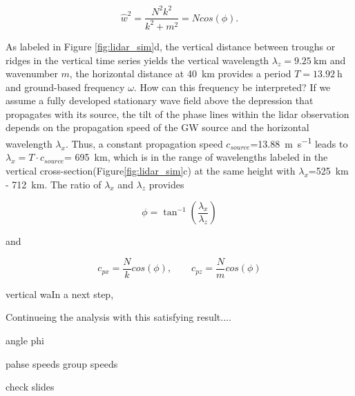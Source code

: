 \begin{equation}
    \hat{w}^2 = \frac{N^2k^2}{k^2+m^2} = Ncos(\phi).
    \label{equ_lid:dispersion}
\end{equation}

As labeled in Figure \ref{fig:lidar_sim}d, the vertical distance between troughs or ridges in the vertical time series yields the vertical wavelength $\lambda_z=\SI{9.25}{\kilo \meter}$ and wavenumber $m$, the horizontal distance at \SI{40}{\kilo \meter} provides a period $T=\SI{13.92}{\hour}$ and ground-based frequency $\omega$. How can this frequency be interpreted? If we assume a fully developed stationary wave field above the depression that propagates with its source, the tilt of the phase lines within the lidar observation depends on the propagation speed of the GW source and the horizontal wavelength $\lambda_x$. Thus, a constant propagation speed $c_{source}$=\SI{13.88}{\meter \per \second} leads to $\lambda_x = T \cdot c_{source}$= \SI{695}{\kilo \meter}, which is in the range of wavelengths labeled in the vertical cross-section(Figure\ref{fig:lidar_sim}c) at the same height with $\lambda_x$=\SI{525}{\kilo \meter} - \SI{712}{\kilo \meter}. The ratio of $\lambda_x$ and $\lambda_z$ provides 

\begin{equation}
    \phi = \tan^{-1}(\frac{\lambda_x}{\lambda_z}) 
    \label{equ_lid:phi}
\end{equation}

and 

\begin{equation}
    c_{px} = \frac{N}{k} cos(\phi), \qquad c_{pz} = \frac{N}{m} cos(\phi)
    \label{equ_lid:cp}
\end{equation}


vertical waIn a next step,

Continueing the analysis with this satisfying result....

angle phi

pahse speeds
group speeds

check slides






